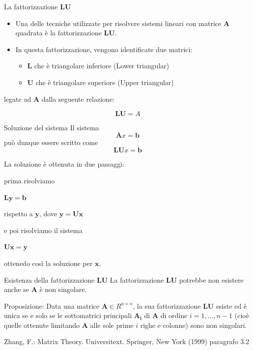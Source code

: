 \begin{frame}{La fattorizzazione \(\mathbf{LU}\)}
\label{la-fattorizzazione-mathbflu}
\begin{itemize}
\item
  Una delle tecniche utilizzate per risolvere sistemi lineari con
  matrice \(\mathbf{A}\) quadrata è la fattorizzazione \(\mathbf{LU}\).
\item
  In questa fattorizzazione, vengono identificate due matrici:

  \begin{itemize}
   
  \item
    \(\mathbf{L}\) che è triangolare inferiore (Lower triangular)
  \item
    \(\mathbf{U}\) che è triangolare superiore (Upper triangular)
  \end{itemize}
\end{itemize}

legate ad \(\mathbf{A}\) dalla seguente relazione:

\[\mathbf{LU}=A\]
\end{frame}

\begin{frame}{Soluzione del sistema}
\label{soluzione-del-sistema}
Il sistema \[\mathbf{A}x=\mathbf{b}\] può dunque essere scritto come
\[\mathbf{LU}x=\mathbf{b}\]

La soluzione è ottenuta in due passaggi:

prima risolviamo

\(\mathbf{Ly=b}\)

rispetto a \(\textbf{y}\), dove \(\mathbf{y=Ux}\)

e poi risolviamo il sistema

\(\mathbf{Ux=y}\)

ottenedo così la soluzione per \(\mathbf{x}\).
\end{frame}

\begin{frame}{Esistenza della fattorizzazione \(\mathbf{LU}\)}
\label{esistenza-della-fattorizzazione-mathbflu}
La fattorizzazione \(\mathbf{LU}\) potrebbe non esistere anche se
\(\mathbf{A}\) è non singolare.

\vskip5mm

Proposizione: Data una matrice \(\mathbf{A}\in R^{n\times n}\), la sua
fattorizzazione \(\mathbf{LU}\) esiste ed è unica se e solo se le
sottomatrici principali \(\mathbf{A_i}\) di \(\mathbf{A}\) di ordine
\(i = 1,...,n-1\) (cioè quelle ottenute limitando \(\mathbf{A}\) alle
sole prime \(i\) righe e colonne) sono non singolari.

\vskip5mm

Zhang, F.: Matrix Theory. Universitext. Springer, New York (1999)
paragrafo 3.2
\end{frame}

